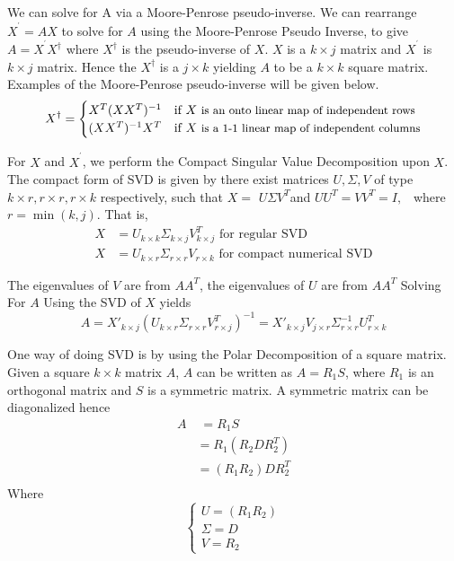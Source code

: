 \documentclass[12pt]{report}
\begin{document}
We can solve for A via a Moore-Penrose pseudo-inverse. We can rearrange $%
X^{^{\prime }}=AX$ to solve for $A$ using the Moore-Penrose Pseudo Inverse,
to give $A=X^{^{\prime }}X^{\dagger }$ where $X^{\dagger }$ is the pseudo-inverse of $X$. $X$ is a $k\times j$ matrix and $X^{^{\prime }}$ is $%
k\times j$ matrix. Hence the $X^{\dagger }$ is a $j\times k$ yielding $A$
to be a $k\times k$ square matrix. Examples of the Moore-Penrose pseudo-inverse will be given below.
\begin{equation}
X^{\dagger}=
    \begin{cases}
        X^{T}(XX^{T})^{-1} & \text{if }X\text{ \small{is an onto linear map of independent rows}} \\
        (XX^{T})^{-1}X^{T} & \text{if }X\text{ \small{is a 1-1 linear map of independent columns}}
    \end{cases}
\end{equation}

For $X$ and $X^{^{\prime }}$, we perform the Compact Singular Value Decomposition upon $X$. The compact form of SVD is given by there exist
matrices $U, \Sigma, V$ of type $k\times r,r\times r,r\times k$
respectively, such that $X=$ $U\Sigma V^{T}$and $UU^{T}=VV^{T}=I,$ \ where $r=\min (k,j).$ That is,
\begin{equation}
    \begin{aligned}
        X&= U_{k\times k}\Sigma _{k\times j}V_{k\times j}^{T}\text{ for regular SVD} \phantom{33}\\
        X& = U_{k\times r}\Sigma _{r\times r}V_{r\times k}\text{ for compact numerical SVD}
    \end{aligned}
\end{equation}

The eigenvalues of $V$ are from $AA^{T}$, the eigenvalues of $U$ are from $%
AA^{T}$  
Solving For $A$ Using the SVD of $X$ yields
\begin{equation}
A =X'_{k\times j}(U_{k\times r}\Sigma_{r\times r} V^{T}_{r\times j})^{-1} =X'_{k\times j}V_{j\times r}\Sigma^{-1}_{r\times r}U^{T}_{r\times k}
\end{equation}

One way of doing SVD is by using the Polar Decomposition of a square matrix. Given a square $k\times k$ matrix $A$, $A$ can be written as $A=R_{1}S$, where $R_{1}$ is an orthogonal matrix and $S$ is a symmetric matrix. A symmetric matrix can be diagonalized hence
\begin{equation}
    \begin{aligned}
        A &\;= R_{1}S \\
        &=R_{1}(R_{2}DR_{2}^{T}) \\
        &=(R_{1}R_{2})DR_{2}^{T} \\
    \end{aligned}
\end{equation}
Where
\begin{equation}
    \begin{cases}
        U=(R_{1}R_{2})\\
        \Sigma =D\\
        V=R_{2}
    \end{cases}
\end{equation}
\end{document}
